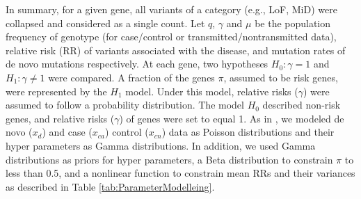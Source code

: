 \documentclass[]{article}
\begin{document}
In summary, for a given gene, all variants of a category
(e.g., LoF, MiD) were collapsed and considered as a
single count. Let $q$, $\gamma$ and $\mu$ be the population frequency of
genotype (for case/control or transmitted/nontransmitted data),
relative risk (RR) of variants associated with the disease, and
mutation rates of de novo mutations respectively.
At each gene, two hypotheses $H_0:
  \gamma = 1$ and $H_1: \gamma \neq 1$ were compared. A fraction of the genes $\pi$, assumed to be risk genes, were represented by the $H_1$ model. Under this model, relative
  risks ($\gamma$) were assumed to follow a probability distribution.
The model $H_0$ described non-risk genes, and relative risks ($\gamma$)
  of genes were set to equal 1. As in
  \cite{he2013integrated}, we modeled de novo ($x_d$) and case
  ($x_{ca}$) control ($x_{cn}$) data as Poisson distributions and
  their hyper parameters as Gamma distributions. In addition, we
  used Gamma distributions as priors for hyper parameters, a Beta
  distribution to constrain $\pi$ to less than 0.5, and a
  nonlinear function to constrain mean RRs and their variances as described in Table
  \ref{tab:ParameterModelleing}.
\end{document}
